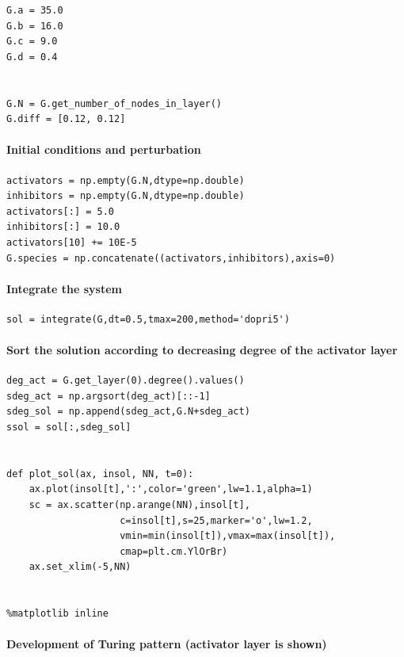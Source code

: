 \documentclass[11pt]{article}
\begin{document}
\begin{verbatim}
G.a = 35.0
G.b = 16.0
G.c = 9.0
G.d = 0.4


G.N = G.get_number_of_nodes_in_layer() 
G.diff = [0.12, 0.12]  
\end{verbatim}

\paragraph{Initial conditions and
perturbation}\label{initial-conditions-and-perturbation}

\begin{verbatim}
activators = np.empty(G.N,dtype=np.double)
inhibitors = np.empty(G.N,dtype=np.double)
activators[:] = 5.0
inhibitors[:] = 10.0
activators[10] += 10E-5
G.species = np.concatenate((activators,inhibitors),axis=0)
\end{verbatim}

\paragraph{Integrate the system}\label{integrate-the-system}

\begin{verbatim}
sol = integrate(G,dt=0.5,tmax=200,method='dopri5')
\end{verbatim}

\paragraph{Sort the solution according to decreasing degree of the
activator
layer}\label{sort-the-solution-according-to-decreasing-degree-of-the-activator-layer}

\begin{verbatim}
deg_act = G.get_layer(0).degree().values()
sdeg_act = np.argsort(deg_act)[::-1]
sdeg_sol = np.append(sdeg_act,G.N+sdeg_act)
ssol = sol[:,sdeg_sol]


def plot_sol(ax, insol, NN, t=0):
    ax.plot(insol[t],':',color='green',lw=1.1,alpha=1)
    sc = ax.scatter(np.arange(NN),insol[t],
                    c=insol[t],s=25,marker='o',lw=1.2,
                    vmin=min(insol[t]),vmax=max(insol[t]),
                    cmap=plt.cm.YlOrBr)
    ax.set_xlim(-5,NN)


%matplotlib inline
\end{verbatim}

\paragraph{Development of Turing pattern (activator layer is
shown)}\label{development-of-turing-pattern-activator-layer-is-shown}
\end{document}
